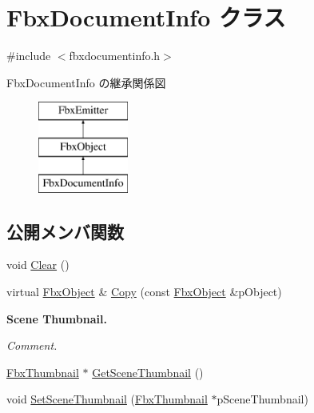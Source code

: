 \hypertarget{class_fbx_document_info}{}\section{Fbx\+Document\+Info クラス}
\label{class_fbx_document_info}


{\ttfamily \#include $<$fbxdocumentinfo.\+h$>$}

Fbx\+Document\+Info の継承関係図\begin{figure}[H]
\begin{center}
\leavevmode
\includegraphics[height=3.000000cm]{class_fbx_document_info}
\end{center}
\end{figure}
\subsection*{公開メンバ関数}
\begin{DoxyCompactItemize}
\item 
void \hyperlink{class_fbx_document_info_a6a372ab1bf0c0e5452230a42c21f0d23}{Clear} ()
\item 
virtual \hyperlink{class_fbx_object}{Fbx\+Object} \& \hyperlink{class_fbx_document_info_ad8433a67149f705181ae78d29f6d99fe}{Copy} (const \hyperlink{class_fbx_object}{Fbx\+Object} \&p\+Object)
\end{DoxyCompactItemize}
\begin{Indent}\textbf{ Scene Thumbnail.}\par
{\em Comment. }\begin{DoxyCompactItemize}
\item 
\hyperlink{class_fbx_thumbnail}{Fbx\+Thumbnail} $\ast$ \hyperlink{class_fbx_document_info_a07a315ce1aaf25dd72035edc0f548d70}{Get\+Scene\+Thumbnail} ()
\item 
void \hyperlink{class_fbx_document_info_ab9498e580c68b5ec5aa38bfe4c4f6123}{Set\+Scene\+Thumbnail} (\hyperlink{class_fbx_thumbnail}{Fbx\+Thumbnail} $\ast$p\+Scene\+Thumbnail)
\end{DoxyCompactItemize}
\end{Indent}
